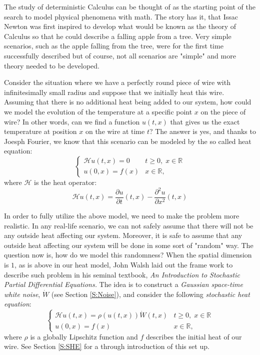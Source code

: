 \documentclass[12pt]{report}
\theoremstyle{plain}
\theoremstyle{definition}
\numberwithin{equation}{section}
\newcommand{\R}{\mathbb{R}}
\begin{document}
The study of deterministic Calculus can be thought of as the starting point of the search to model physical phenomena with math. The story has it, that Issac Newton was first inspired to develop what would be known as the theory of Calculus so that he could describe a falling apple from a tree. Very simple scenarios, such as the apple falling from the tree, were for the first time successfully described but of course, not all scenarios are "simple" and more theory needed to be developed. 

Consider the situation where we have a perfectly round piece of wire with infinitesimally small radius and suppose that we initially heat this wire. Assuming that there is no additional heat being added to our system, how could we model the evolution of the temperature at a specific point $x$ on the piece of wire? In other words, can we find a function $u(t,x)$ that gives us the exact temperature at position $x$ on the wire at time $t$? The answer is yes, and thanks to Joesph Fourier, we know that this scenario can be modeled by the so called heat equation:
	\[
		\begin{cases}
			\mathcal{H}u(t,x) = 0 & t \ge 0, \; x \in \R \\
			u(0,x) = f(x) & x \in \R,
		\end{cases}
	\]
where $\mathcal{H}$ is the heat operator:
	\[
		\mathcal{H}u(t,x) = \frac{\partial u}{\partial t}(t,x) - \frac{\partial^2 u}{\partial x^2}(t,x)
	\]

In order to fully utilize the above model, we need to make the problem more realistic. In any real-life scenario, we can not safely assume that there will not be any outside heat affecting our system. Moreover, it is safe to assume that any outside heat affecting our system will be done in some sort of "random" way. The question now is, how do we model this randomness? When the spatial dimension is $1$, as is above in our heat model, John Walsh laid out the frame work to describe such problem in his seminal textbook, {\em An Introduction to Stochastic Partial Differential Equations.} The idea is to construct a {\em Gaussian space-time white noise}, $\dot{W}$ (see Section \ref{S:Noise}), and consider the following {\em stochastic heat equation}:
	\begin{equation}\label{E:introSHE}
	\begin{cases}
		\mathcal{H}u(t,x)  = \rho(u(t,x))\dot{W}(t,x) & t \ge 0, \; x \in \R \\
	u(0,x) = f(x) & x \in \R,
	\end{cases}
	\end{equation}
where $\rho$ is a globally Lipschitz function and $f$ describes the initial heat of our wire. See Section \ref{S:SHE} for a through introduction of this set up.
	
\end{document}
